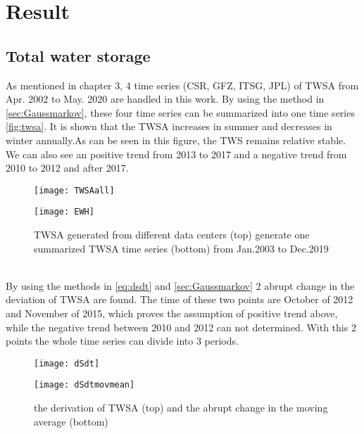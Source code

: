 \chapter{Result}
\section{Total water storage}
As mentioned in chapter 3, 4 time series (CSR, GFZ, ITSG, JPL) of TWSA from Apr. 2002 to May. 2020 are handled in this work. By using the method in \autoref{sec:Gaussmarkov}, these four time series can be summarized into one time series \autoref{fig:twsa}. It is shown that the TWSA increases in summer and decreases in winter annually.As can be seen in this figure, the TWS remains relative stable. We can also see an positive trend from 2013 to 2017 and a negative trend from 2010 to 2012 and after 2017.   \\
\begin{figure}[htbp]\centering
	\begin{minipage}[t]{0.85\textwidth}
		\centering
		\texttt{[image: TWSAall]} %
	\end{minipage}
	\begin{minipage}[t]{0.85\textwidth}
		\centering
		\texttt{[image: EWH]} %
	\end{minipage}
	\caption{TWSA generated from different data centers (top) generate one summarized TWSA time series (bottom) from Jan.2003 to Dec.2019}
	\label{fig:twsa}
\end{figure}\\
By using the methods in \autoref{eq:dsdt} and \autoref{sec:Gaussmarkov} 2 abrupt change in the deviation of TWSA are found. The time of these two points are October of 2012 and November of 2015, which proves the assumption of positive trend above, while the negative trend between 2010 and 2012 can not determined. With this 2 points the whole time series can divide into 3 periods.
\begin{figure}[htbp]\centering
	\begin{minipage}[t]{0.7\textwidth}
		\centering
		\texttt{[image: dSdt]} %
	\end{minipage}
	\begin{minipage}[t]{0.7\textwidth}
		\centering
		\texttt{[image: dSdtmovmean]} %
	\end{minipage}
	\caption{the derivation of TWSA (top) and the abrupt change in the moving average (bottom)}
	\label{fig:dsdt}
\end{figure}\\
